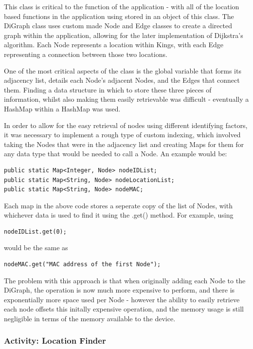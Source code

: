 \documentclass[11pt]{informatics-report}
\begin{document}
This class is critical to the function of the application - with all of the location based functions in the application using stored in an object of this class. The DiGraph class uses custom made Node and Edge classes to create a directed graph within the application, allowing for the later implementation of Dijkstra's algorithm. Each Node represents a location within Kings, with each Edge representing a connection between those two locations.

One of the most critical aspects of the class is the global variable that forms its adjacency list, details each Node's adjacent Nodes, and the Edges that connect them. Finding a data structure in which to store these three pieces of information, whilst also making them easily retrievable was difficult - eventually a HashMap within a HashMap was used. 

In order to allow for the easy retrieval of nodes using different identifying factors, it was necessary to implement a rough type of custom indexing, which involved taking the Nodes that were in the adjacency list and creating Maps for them for any data type that would be needed to call a Node. An example would be:

\begin{lstlisting}[frame=single]
public static Map<Integer, Node> nodeIDList;
public static Map<String, Node> nodeLocationList;
public static Map<String, Node> nodeMAC;  
\end{lstlisting}

Each map in the above code stores a seperate copy of the list of Nodes, with whichever data is used to find it using the .get() method. For example, using 

\begin{lstlisting}[frame=single]
nodeIDList.get(0);
\end{lstlisting}
would be the same as

\begin{lstlisting}[frame=single]
nodeMAC.get("MAC address of the first Node");
\end{lstlisting}

The problem with this approach is that when originally adding each Node to the DiGraph, the operation is now much more expensive to perform, and there is exponentially more space used per Node - however the ability to easily retrieve each node offsets this initally expensive operation, and the memory usage is still negligible in terms of the memory available to the device.

\subsubsection{Activity: Location Finder}
\end{document}
